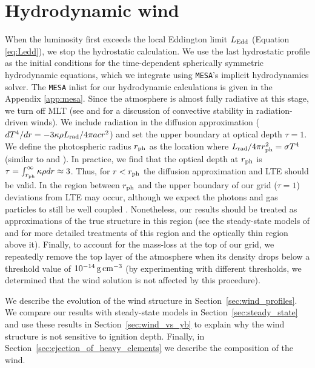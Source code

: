 \documentclass[apj,usenatbib, iop, twocolappendix]{emulateapj}
\newcommand{\Lrad}{L_{\rm rad}}
\begin{document}
\section{Hydrodynamic wind}
\label{sec:num_wind}


When the luminosity first exceeds the local Eddington limit $L_{\rm Edd}$ (Equation \ref{eq:Ledd}), we stop the hydrostatic calculation. We use the last hydrostatic profile as the initial conditions for the time-dependent spherically symmetric hydrodynamic equations, which we integrate using \texttt{MESA}'s implicit hydrodynamics solver. The \texttt{MESA} inlist for our hydrodynamic calculations is given in the Appendix \ref{app:mesa}.  Since the atmosphere is almost fully radiative at this stage, we turn off MLT (see \citealt{Ro:16} and \citealt{Quataert:16} for a discussion of  convective stability in radiation-driven winds).  
We include radiation in the diffusion approximation ($dT^4/dr=-3\kappa \rho \Lrad/4\pi ac r^2$)  and set the upper boundary at  optical depth  $\tau=1$. We define the photospheric radius $r_{\rm ph}$ as the location where $\Lrad/4\pi r_{\rm ph}^2=\sigma T^4$ (similar to \citealt{Quinn:85} and \citealt{Paczynski:86}).  In practice, we find that the optical depth at $r_{\rm ph}$ is $\tau = \int_{r_{\rm ph}}^\infty \kappa \rho dr \approx 3$. Thus, for $r < r_{\rm ph}$ the diffusion approximation and LTE should be valid.   In the region between $r_{\rm ph}$ and the upper boundary of our grid ($\tau=1$) deviations from LTE may occur, although we expect the photons and gas particles to still be well coupled \citep{Joss:87}.  Nonetheless, our results should be treated as approximations of the true structure in this region (see the steady-state models of \citealt{Joss:87} and \citealt{Nobili:94} for more detailed treatments of this region and the optically thin region above it). Finally, to account for the mass-loss at the top of our grid, we repeatedly remove the top layer of the atmosphere when its density drops below a threshold value of $10^{-14}\,{\rm g\,cm^{-3}}$ (by experimenting with different thresholds, we determined that the wind solution is not affected by this procedure).

We describe the evolution of the wind structure in Section~\ref{sec:wind_profiles}.  We compare our results with steady-state models in Section~\ref{sec:steady_state} and use these results in Section~\ref{sec:wind_vs_yb} to explain why the wind structure is not sensitive to ignition depth.  Finally, in Section~\ref{sec:ejection_of_heavy_elements} we describe the composition of the wind.
\end{document}
